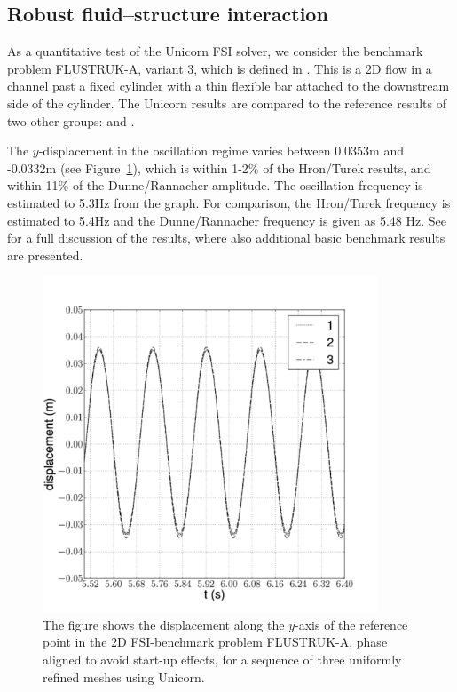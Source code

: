 \subsection{Robust fluid--structure interaction}

As a quantitative test of the Unicorn FSI solver, we consider
the benchmark problem FLUSTRUK-A, variant 3, which is defined in
\citet{HronTurek2005}. This is a 2D flow in a channel past a fixed
cylinder with a thin flexible bar attached to the downstream side of the
cylinder. The Unicorn results are compared to the reference results of
two other groups: \citet{HronTurek2005} and \citet{DunneRannacher2006}.

The $y$-displacement in the oscillation regime varies between 0.0353m
and -0.0332m (see Figure~\ref{hoffman-1:fig:flustruk}), which is within 1-2\% of
the Hron/Turek results, and within 11\% of the Dunne/Rannacher
amplitude. The oscillation frequency is estimated to 5.3Hz from the
graph. For comparison, the Hron/Turek frequency is estimated to 5.4Hz
and the Dunne/Rannacher frequency is given as 5.48 Hz. See
\citet{HoffmanJanssonStockli2011} for a full discussion of the
results, where also additional basic benchmark results are presented.

\begin{figure}
  \center\includegraphics[width=10cm]{chapters/hoffman-1/png/fsi_bench3D_displacement_aligned.pdf}
  \caption{The figure shows the displacement along the $y$-axis of the
    reference point in the 2D FSI-benchmark problem FLUSTRUK-A, phase
    aligned to avoid start-up effects, for a sequence of three
    uniformly refined meshes using Unicorn.}
  \label{hoffman-1:fig:flustruk}
\end{figure}

